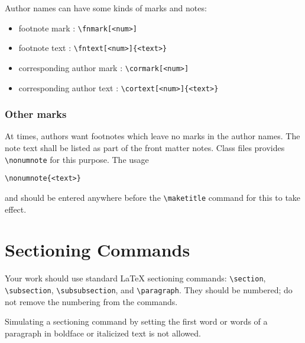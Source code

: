\documentclass[
 twocolumn,
 hf,
]{ceurart}
\begin{document}
Author names can have some kinds of marks and notes:
\begin{itemize}
\item footnote mark : \verb|\fnmark[<num>]|
\item footnote text : \verb|\fntext[<num>]{<text>}|
\item corresponding author mark : \verb|\cormark[<num>]|
\item corresponding author text : \verb|\cortext[<num>]{<text>}|
\end{itemize}

\subsubsection{Other marks}

At times, authors want footnotes which leave no marks in
the author names. The note text shall be listed as part of
the front matter notes. Class files provides
\verb|\nonumnote| for this purpose. The usage
\begin{lstlisting}
\nonumnote{<text>}
\end{lstlisting}
and should be entered anywhere before the \verb|\maketitle|
command for this to take effect. 

\section{Sectioning Commands}

Your work should use standard \LaTeX{} sectioning commands:
\verb|\section|, \verb|\subsection|,
\verb|\subsubsection|, and
\verb|\paragraph|. They should be numbered; do not remove
the numbering from the commands.

Simulating a sectioning command by setting the first word or words of
a paragraph in boldface or italicized text is not allowed.
\end{document}
